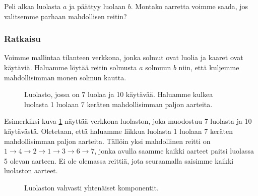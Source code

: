 Peli alkaa luolasta $a$ ja päättyy luolaan $b$.
Montako aarretta voimme saada, jos valitsemme parhaan
mahdollisen reitin?

\subsubsection{Ratkaisu}

Voimme mallintaa tilanteen verkkona, jonka solmut ovat luolia ja
kaaret ovat käytäviä. Haluamme löytää reitin solmusta $a$ solmuun $b$
niin, että kuljemme mahdollisimman monen solmun kautta.

\begin{figure}
\center
\begin{center}
\end{center}
\caption{Luolasto, jossa on 7 luolaa ja 10 käytävää.
Haluamme kulkea luolasta 1 luolaan 7 keräten mahdollisimman paljon aarteita.}
\label{fig:luopel}
\end{figure}

Esimerkiksi kuva \ref{fig:luopel} näyttää verkkona luolaston, joka muodostuu
7 luolasta ja 10 käytävästä.
Oletetaan, että haluamme liikkua luolasta 1 luolaan 7
keräten mahdollisimman paljon aarteita.
Tällöin yksi mahdollinen reitti on
$1 \rightarrow 4 \rightarrow 2 \rightarrow 1 \rightarrow 3 \rightarrow 6 \rightarrow 7$,
jonka avulla saamme kaikki aarteet paitsi luolassa 5 olevan aarteen.
Ei ole olemassa reittiä, jota seuraamalla saisimme kaikki luolaston aarteet.

\begin{figure}
\center
\begin{center}
\end{center}
\caption{Luolaston vahvasti yhtenäiset komponentit.}
\label{fig:luovah}
\end{figure}

